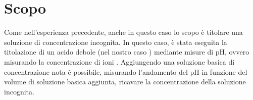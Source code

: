 \section*{Scopo}

Come nell'esperienza precedente, anche in questo caso lo scopo è titolare una
soluzione di concentrazione incognita.
In questo caso, è stata eseguita la titolazione di un acido debole (nel nostro caso ) mediante misure di pH, ovvero misurando la concentrazione di ioni .
Aggiungendo una soluzione basica di concentrazione nota è possibile, misurando l'andamento del pH in funzione del volume di soluzione basica aggiunta, ricavare la concentrazione della soluzione incognita.
